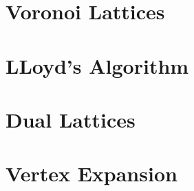 \section{Voronoi Lattices}\label{sec:voronoi}
\section{LLoyd's Algorithm}
\section{Dual Lattices}
\section{Vertex Expansion}